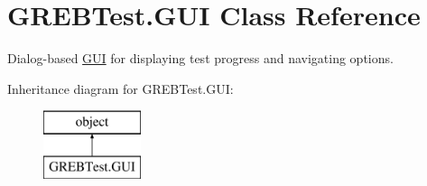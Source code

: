 \hypertarget{class_g_r_e_b_test_1_1_g_u_i}{}\section{G\+R\+E\+B\+Test.\+G\+UI Class Reference}
\label{class_g_r_e_b_test_1_1_g_u_i}


Dialog-\/based \hyperlink{class_g_r_e_b_test_1_1_g_u_i}{G\+UI} for displaying test progress and navigating options.  


Inheritance diagram for G\+R\+E\+B\+Test.\+G\+UI\+:\begin{figure}[H]
\begin{center}
\leavevmode
\includegraphics[height=2.000000cm]{class_g_r_e_b_test_1_1_g_u_i}
\end{center}
\end{figure}
